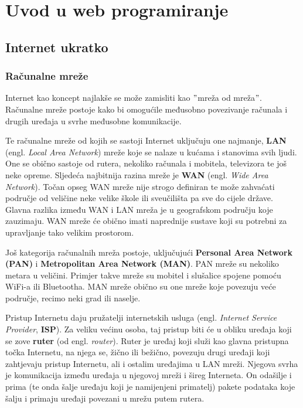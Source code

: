 \chapter{Uvod u web programiranje}\label{ch:uvod-u-web-programiranje}

\section{Internet ukratko}\label{sec:internet-ukratko}

\subsection{Računalne mreže}\label{subsec:racunalne-mreze}

Internet kao koncept najlakše se može zamisliti kao \("\)mreža od mreža\("\).
Računalne mreže postoje kako bi omogućile međusobno povezivanje računala i drugih uređaja u svrhe međusobne komunikacije.

Te računalne mreže od kojih se sastoji Internet uključuju one najmanje, \textbf{LAN} (engl. \textit{Local Area Network}) mreže koje se nalaze u kućama i stanovima svih ljudi.
One se obično sastoje od rutera, nekoliko računala i mobitela, televizora te još neke opreme.
Sljedeća najbitnija razina mreže je \textbf{WAN} (engl. \textit{Wide Area Network}).
Točan opseg WAN mreže nije strogo definiran te može zahvaćati područje od veličine neke velike škole ili sveučilišta pa sve do cijele države.
Glavna razlika između WAN i LAN mreža je u geografskom području koje zauzimaju.
WAN mreže će obično imati naprednije sustave koji su potrebni za upravljanje tako velikim prostorom.

Još kategorija računalnih mreža postoje, uključujući \textbf{Personal Area Network (PAN)} i \textbf{Metropolitan Area Network (MAN)}.
PAN mreže su nekoliko metara u veličini.
Primjer takve mreže su mobitel i slušalice spojene pomoću WiFi-a ili Bluetootha.
MAN mreže obično su one mreže koje povezuju veće područje, recimo neki grad ili naselje.

Pristup Internetu daju pružatelji internetskih usluga (engl. \textit{Internet Service Provider}, \textbf{ISP}).
Za veliku većinu osoba, taj pristup biti će u obliku uređaja koji se zove \textbf{ruter} (od engl. \textit{router}).
Ruter je uređaj koji služi kao glavna pristupna točka Internetu, na njega se, žično ili bežično, povezuju drugi uređaji koji zahtjevaju pristup Internetu, ali i ostalim uređajima u LAN mreži.
Njegova svrha je komunikacija između uređaja u njegovoj mreži i šireg Interneta.
On odašilje i prima (te onda šalje uređaju koji je namijenjeni primatelj) pakete podataka koje šalju i primaju uređaji povezani u mrežu putem rutera.

